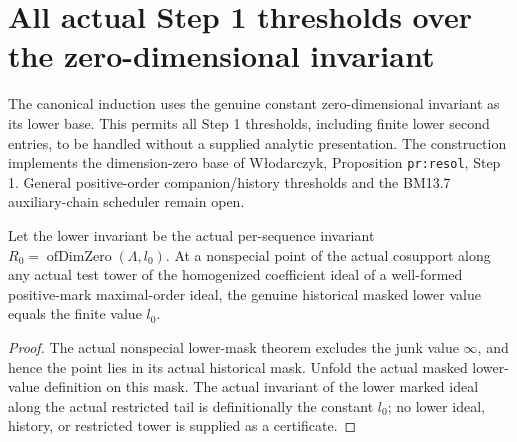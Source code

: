 \section{All actual Step 1 thresholds over the zero-dimensional invariant}

The canonical induction uses the genuine constant zero-dimensional
invariant as its lower base. This permits all Step 1 thresholds, including
finite lower second entries, to be handled without a supplied analytic
presentation. The construction implements the dimension-zero base of
W{\l}odarczyk\cite{wlodarczyk05-hironaka}, Proposition
\texttt{pr:resol}, Step 1. General positive-order companion/history
thresholds and the BM13.7 auxiliary-chain scheduler remain open.

\begin{lemma}
\label{hir:step-one-dimzero-actual-lower-value}
\leanok
Let the lower invariant be the actual per-sequence invariant
$R_0=\operatorname{ofDimZero}(\Lambda,l_0)$. At a nonspecial point of
the actual cosupport along any actual test tower of the homogenized
coefficient ideal of a well-formed positive-mark maximal-order ideal,
the genuine historical masked lower value equals the finite value $l_0$.
\end{lemma}
\begin{proof}
The actual nonspecial lower-mask theorem excludes the junk value
$\infty$, and hence the point lies in its actual historical mask.
Unfold the actual masked lower-value definition on this mask. The
actual invariant of the lower marked ideal along the actual restricted
tail is definitionally the constant $l_0$; no lower ideal, history,
or restricted tower is supplied as a certificate.
\end{proof}

